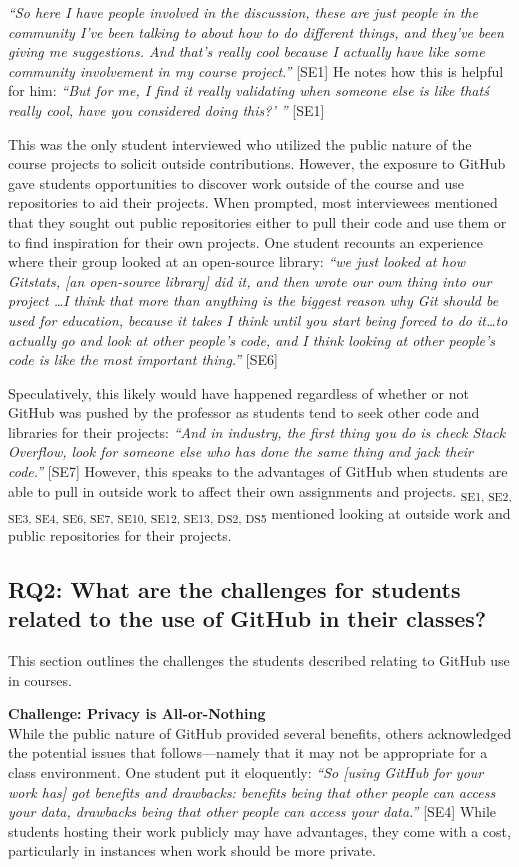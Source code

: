 \textit{``So here I have people involved in the discussion, these are just people in the community I've been talking to about how to do different things, and they've been giving me suggestions. And that's really cool because I actually have like some community involvement in my course project.''} [SE1] He notes how this is helpful for him: \textit{``But for me, I find it really validating when someone else is like \'that\'s really cool, have you considered doing this?' ''} [SE1]

This was the only student interviewed who utilized the public nature of the course projects to solicit outside contributions. However, the exposure to GitHub gave students opportunities to discover work outside of the course and use repositories to aid their projects. When prompted, most interviewees mentioned that they sought out public repositories either to pull their code and use them or to find inspiration for their own projects. One student recounts an experience where their group looked at an open-source library: \textit{``we just looked at how Gitstats, [an open-source library] did it, and then wrote our own thing into our project \ldots I think that more than anything is the biggest reason why Git should be used for education, because it takes I think until you start being forced to do it\ldots to actually go and look at other people's code, and I think looking at other people's code is like the most important thing.''} [SE6]

Speculatively, this likely would have happened regardless of whether or not GitHub was pushed by the professor as students tend to seek other code and libraries for their projects: \textit{``And in industry, the first thing you do is check Stack Overflow, look for someone else who has done the same thing and jack their code.''} [SE7] However, this speaks to the advantages of GitHub when students are able to pull in outside work to affect their own assignments and projects. \textsubscript{SE1, SE2, SE3, SE4, SE6, SE7, SE10, SE12, SE13, DS2, DS5} mentioned looking at outside work and public repositories for their projects.

\subsection{RQ2: What are the challenges for students related to the use of GitHub in their classes?}
This section outlines the challenges the students described relating to GitHub use in courses. 

\textbf{Challenge: Privacy is All-or-Nothing} \\
While the public nature of GitHub provided several benefits, others acknowledged the potential issues that follows---namely that it may not be appropriate for a class environment. One student put it eloquently: \textit{``So [using GitHub for your work has] got benefits and drawbacks: benefits being that other people can access your data, drawbacks being that other people can access your data.''} [SE4] While students hosting their work publicly may have advantages, they come with a cost, particularly in instances when work should be more private.

